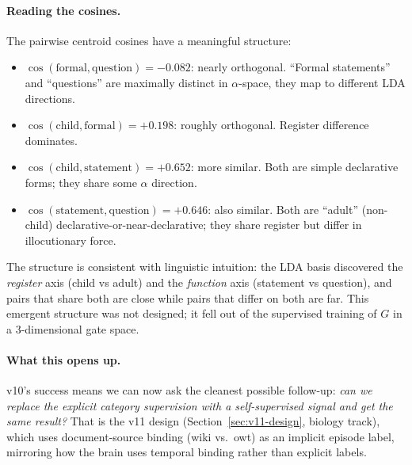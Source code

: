 \documentclass[11pt, a4paper]{article}
\theoremstyle{plain}
\theoremstyle{definition}
\theoremstyle{remark}
\begin{document}
\paragraph{Reading the cosines.}
The pairwise centroid cosines have a meaningful structure:
\begin{itemize}[nosep]
\item $\cos(\text{formal}, \text{question}) = -0.082$: nearly orthogonal. ``Formal statements'' and ``questions'' are maximally distinct in $\alpha$-space, they map to different LDA directions.
\item $\cos(\text{child}, \text{formal}) = +0.198$: roughly orthogonal. Register difference dominates.
\item $\cos(\text{child}, \text{statement}) = +0.652$: more similar. Both are simple declarative forms; they share some $\alpha$ direction.
\item $\cos(\text{statement}, \text{question}) = +0.646$: also similar. Both are ``adult'' (non-child) declarative-or-near-declarative; they share register but differ in illocutionary force.
\end{itemize}
The structure is consistent with linguistic intuition: the LDA basis discovered the \emph{register} axis (child vs adult) and the \emph{function} axis (statement vs question), and pairs that share both are close while pairs that differ on both are far.
This emergent structure was not designed; it fell out of the supervised training of $G$ in a 3-dimensional gate space.

\paragraph{What this opens up.}
v10's success means we can now ask the cleanest possible follow-up: \emph{can we replace the explicit category supervision with a self-supervised signal and get the same result?}
That is the v11 design (Section~\ref{sec:v11-design}, biology track), which uses document-source binding (wiki vs.\ owt) as an implicit episode label, mirroring how the brain uses temporal binding rather than explicit labels.
\end{document}
